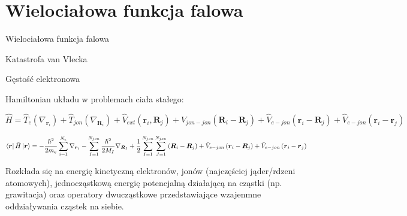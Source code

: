 \section{Wielociałowa funkcja falowa}

Wielociałowa funkcja falowa

Katastrofa van Vlecka

Gęstość elektronowa

Hamiltonian układu w problemach ciała stałego:

\[
\hat{H}=\hat{T}_{e}\left(\nabla_{\boldsymbol{r}_{i}}\right)+\hat{T}_{jon}\left(\nabla_{\boldsymbol{R}_{i}}\right)+\hat{V}_{ext}\left(\boldsymbol{r}_{i},\boldsymbol{R}_{j}\right)+\hat{V}_{jon-jon}\left(\boldsymbol{R}_{i}-\boldsymbol{R}_{j}\right)+\hat{V}_{e-jon}\left(\boldsymbol{r}_{i}-\boldsymbol{R}_{j}\right)+\hat{V}_{e-jon}\left(\boldsymbol{r}_{i}-\boldsymbol{r}_{j}\right)
\]

\begin{equation}
\bra{\boldsymbol{r}}\hat{H}\ket{\boldsymbol{r}}=-\frac{\hbar^2}{2 m_e} \sum_{i=1}^{N_e} \nabla_{\boldsymbol{r}_{i}}
-\sum_{I=1}^{N_{jon}} \frac{\hbar^2}{2 M_I} \nabla_{\boldsymbol{R}_{I}}+
\frac{1}{2}\sum_{I=1}^{N_{jon}}\sum_{J=1}^{N_{jon}}\left(\boldsymbol{R}_{i}-\boldsymbol{R}_{j}\right)+
\hat{V}_{e-jon}\left(\boldsymbol{r}_{i}-\boldsymbol{R}_{j}\right)+
\hat{V}_{e-jon}\left(\boldsymbol{r}_{i}-\boldsymbol{r}_{j}\right)
\end{equation}


Rozkłada się na energię kinetyczną elektronów, jonów (najczęściej
jąder/rdzeni atomowych), jednocząstkową energię potencjalną działającą
na cząstki (np. grawitacja) oraz operatory dwucząstkowe przedstawiające
wzajenmne oddziaływania cząstek na siebie.

